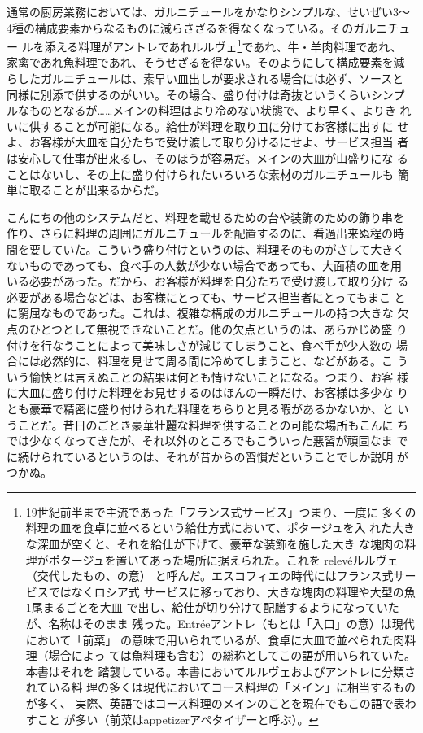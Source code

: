 通常の厨房業務においては、ガルニチュールをかなりシンプルな、せいぜい3〜
4種の構成要素からなるものに減らさざるを得なくなっている。そのガルニチュー
ルを添える料理がアントレであれルルヴェ\footnote{19世紀前半まで主流であった「フランス式サービス」つまり、一度に
  多くの料理の皿を食卓に並べるという給仕方式において、ポタージュを入
  れた大きな深皿が空くと、それを給仕が下げて、豪華な装飾を施した大き
  な塊肉の料理がポタージュを置いてあった場所に据えられた。これを
  \protect\hypertarget{releve}{relevé}ルルヴェ（交代したもの、の意）
  と呼んだ。エスコフィエの時代にはフランス式サービスではなくロシア式
  サービスに移っており、大きな塊肉の料理や大型の魚1尾まるごとを大皿
  で出し、給仕が切り分けて配膳するようになっていたが、名称はそのまま
  残った。Entréeアントレ（もとは「入口」の意）は現代において「前菜」
  の意味で用いられているが、食卓に大皿で並べられた肉料理（場合によっ
  ては魚料理も含む）の総称としてこの語が用いられていた。本書はそれを
  踏襲している。本書においてルルヴェおよびアントレに分類されている料
  理の多くは現代においてコース料理の「メイン」に相当するものが多く、
  実際、英語ではコース料理のメインのことを現在でもこの語で表わすこと
  が多い（前菜はappetizerアペタイザーと呼ぶ）。}であれ、牛・羊肉料理であれ、
家禽であれ魚料理であれ、そうせざるを得ない。そのようにして構成要素を減
らしたガルニチュールは、素早い皿出しが要求される場合には必ず、ソースと
同様に別添で供するのがいい。その場合、盛り付けは奇抜というくらいシンプ
ルなものとなるが\ldots{}\ldots{}メインの料理はより冷めない状態で、より早く、よりき
れいに供することが可能になる。給仕が料理を取り皿に分けてお客様に出すに
せよ、お客様が大皿を自分たちで受け渡して取り分けるにせよ、サービス担当
者は安心して仕事が出来るし、そのほうが容易だ。メインの大皿が山盛りにな
ることはないし、その上に盛り付けられたいろいろな素材のガルニチュールも
簡単に取ることが出来るからだ。

こんにちの他のシステムだと、料理を載せるための台や装飾のための飾り串を
作り、さらに料理の周囲にガルニチュールを配置するのに、看過出来ぬ程の時
間を要していた。こういう盛り付けというのは、料理そのものがさして大きく
ないものであっても、食べ手の人数が少ない場合であっても、大面積の皿を用
いる必要があった。だから、お客様が料理を自分たちで受け渡して取り分け
る必要がある場合などは、お客様にとっても、サービス担当者にとってもまこ
とに窮屈なものであった。これは、複雑な構成のガルニチュールの持つ大きな
欠点のひとつとして無視できないことだ。他の欠点というのは、あらかじめ盛
り付けを行なうことによって美味しさが減じてしまうこと、食べ手が少人数の
場合には必然的に、料理を見せて周る間に冷めてしまうこと、などがある。こ
ういう愉快とは言えぬことの結果は何とも情けないことになる。つまり、お客
様に大皿に盛り付けた料理をお見せするのはほんの一瞬だけ、お客様は多少な
りとも豪華で精密に盛り付けられた料理をちらりと見る暇があるかないか、と
いうことだ。昔日のごとき豪華壮麗な料理を供することの可能な場所もこんに
ちでは少なくなってきたが、それ以外のところでもこういった悪習が頑固なま
でに続けられているというのは、それが昔からの習慣だということでしか説明
がつかぬ。

